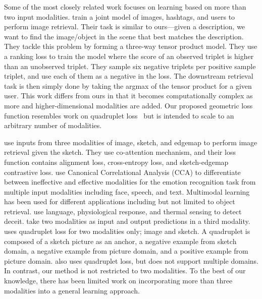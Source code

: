 \documentclass[10pt]{article} %
\begin{document}
Some of the most closely related work focuses on learning based on more than two input modalities. \citet{Veit_2018_CVPR} train a joint model of images, hashtags, and users to perform image retrieval. Their task is similar to ours---given a description, we want to find the image/object in the scene that best matches the description. They tackle this problem by forming a three-way tensor product model. They use a ranking loss to train the model where the score of an observed triplet is higher than an unobserved triplet. They sample six negative triplets per positive sample triplet, and use each of them as a negative in the loss. The downstream retrieval task is then simply done by taking the argmax of the tensor product for a given user. This work differs from ours in that it becomes computationally complex as more and higher-dimensional modalities are added.
Our proposed geometric loss function resembles work on quadruplet loss~\cite{chen2017beyond,tursun2021efficient} but is intended to scale to an arbitrary number of modalities.

\citet{semihet_three_way_Lei_2020} use inputs from three modalities of image, sketch, and edgemap to perform image retrieval given the sketch. They use co-attention mechanism, and their loss function contains alignment loss, cross-entropy loss, and sketch-edgemap contrastive loss. \citet{Mittal2020M3ER} use Canonical Correlational Analysis (CCA) to differentiate between ineffective and effective modalities for the emotion recognition task from multiple input modalities including face, speech, and text. Multimodal learning has been used for different applications including but not limited to object retrieval. \citet{Deception_ICMI_2014} use language, physiological response, and thermal sensing to detect deceit. \citet{het_data_fusion_liu_IEEE_2017} take two modalities as input and output predictions in a third modality. \citet{tursun2021efficient} uses quadruplet loss for two modalities only; image and sketch. A quadruplet is composed of a sketch picture as an anchor, a negative example from sketch domain, a negative example from picture domain,  and a positive example from picture domain. \citet{chen2017beyond} also uses quadruplet loss, but does not support multiple domains. In contrast, our method is not restricted to two modalities.
To the best of our knowledge, there has been limited work on incorporating more than three modalities into a general learning approach. 


\end{document}

